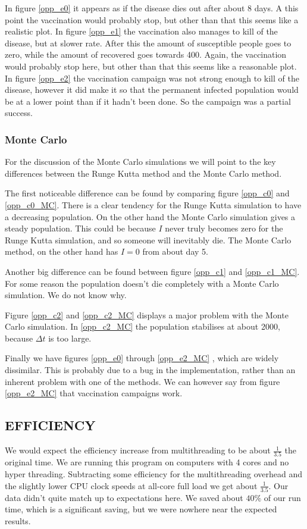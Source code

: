 \documentclass[a4paper]{article}
\let\Oldsubsection\subsection
\renewcommand{\subsection}{\FloatBarrier\Oldsubsection}
\let\Oldsubsubsection\subsubsection
\renewcommand{\subsubsection}{\FloatBarrier\Oldsubsubsection}
\begin{document}
	In figure \ref{opp_e0} it appears as if the disease dies out after about 8 days. A this point the vaccination would probably stop, but other than that this seems like a realistic plot. In figure \ref{opp_e1} the vaccination also manages to kill of the disease, but at slower rate. After this the amount of susceptible people goes to zero, while the amount of recovered goes towards 400. Again, the vaccination would probably stop here, but other than that this seems like a reasonable plot. In figure \ref{opp_e2} the vaccination campaign was not strong enough to kill of the disease, however it did make it so that the permanent infected population would be at a lower point than if it hadn't been done. So the campaign was a partial success.
	\subsubsection{Monte Carlo}
	For the discussion of the Monte Carlo simulations we will point to the key differences between the Runge Kutta method and the Monte Carlo method. 
	
	The first noticeable difference can be found by comparing figure \ref{opp_c0} and \ref{opp_c0_MC}. There is a clear tendency for the Runge Kutta simulation to have a decreasing population. On the other hand the Monte Carlo simulation gives a steady population. This could be because $I$ never truly becomes zero for the Runge Kutta simulation, and so someone will inevitably die. The Monte Carlo method, on the other hand has $I = 0$ from about day 5.
	
	Another big difference can be found between figure \ref{opp_c1} and \ref{opp_c1_MC}. For some reason the population doesn't die completely with a Monte Carlo simulation. We do not know why.
	
	Figure \ref{opp_c2} and \ref{opp_c2_MC} displays a major problem with the Monte Carlo simulation. In \ref{opp_c2_MC} the population stabilises at about 2000, because $\Delta t$ is too large.
	
	Finally we have figures \ref{opp_e0} through \ref{opp_e2_MC} , which are widely dissimilar. This is probably due to a bug in the implementation, rather than an inherent problem with one of the methods. We can however say from figure \ref{opp_e2_MC} that vaccination campaigns work.
	
	\subsection{EFFICIENCY}
	We would expect the efficiency increase from multithreading to be about $\frac{1}{3.5}$ the original time. We are running this program on computers with 4 cores and no hyper threading. Subtracting some efficiency for the multithreading overhead and the slightly lower CPU clock speeds at all-core full load we get about $\frac{1}{3.5}$. Our data didn't quite match up to expectations here. We saved about $40\%$ of our run time, which is a significant saving, but we were nowhere near the expected results.
	
\end{document}
